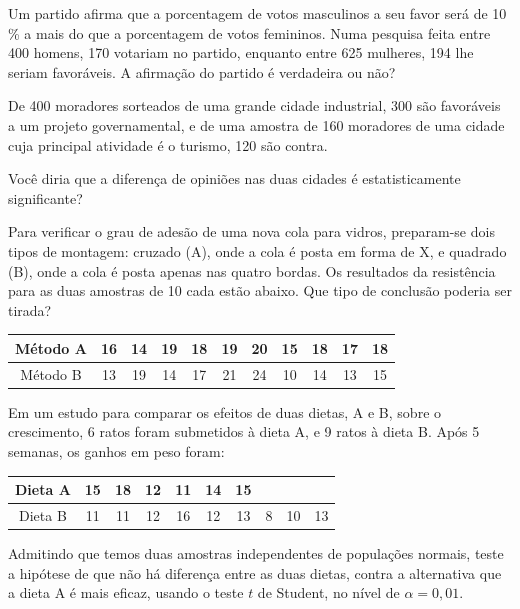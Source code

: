 \documentclass{report}
\begin{document}
\begin{Exercise}
\Question Um partido afirma que a porcentagem de votos masculinos a seu favor será de 10 \% a mais do que a porcentagem de votos femininos. Numa pesquisa feita entre 
400 homens, 170 votariam no partido, enquanto entre 625 mulheres, 194 lhe seriam favoráveis. A afirmação do partido é verdadeira ou não?

\Question De 400 moradores sorteados de uma grande cidade industrial, 300 são favoráveis a um projeto governamental, e de uma amostra de 160 moradores de uma cidade 
cuja principal atividade é o turismo, 120 são contra.
\begin{tasks}
\task Você diria que a diferença de opiniões nas duas cidades é estatisticamente significante?
\end{tasks}

\Question Para verificar o grau de adesão de uma nova cola para vidros, preparam-se dois tipos de montagem: cruzado (A), onde a cola é posta em forma de X, e quadrado (B), 
onde a cola é posta apenas nas quatro bordas. Os resultados da resistência para as duas amostras de 10 cada estão abaixo. Que tipo de conclusão poderia ser tirada?

\begin{tabular}{c|c|c|c|c|c|c|c|c|c|c} \hline
Método A & 16 & 14 & 19 & 18 & 19 & 20 & 15 & 18 & 17 & 18 \\ \hline
Método B & 13 & 19 & 14 & 17 & 21 & 24 & 10 & 14 & 13 & 15 \\ \hline
\end{tabular}

\Question Em um estudo para comparar os efeitos de duas dietas, A e B, sobre o crescimento, 6 ratos foram submetidos à dieta A, e 9 ratos à dieta B. Após 5 semanas, os ganhos em peso foram:

\begin{tabular}{c|c|c|c|c|c|c|c|c|c} \hline
Dieta A & 15 & 18 & 12 & 11 & 14 & 15 &  & &  \\ \hline
Dieta B & 11 & 11 & 12 & 16 & 12 & 13 & 8 & 10 & 13  \\ \hline
\end{tabular}
\begin{tasks}
\task Admitindo que temos duas amostras independentes de populações normais, teste a hipótese de que não há diferença entre as duas dietas, contra a alternativa que a 
dieta A é mais eficaz, usando o teste $t$ de Student, no nível de $\alpha = 0,01$.
\end{tasks}

\newpage


\end{Exercise}
\end{document}
